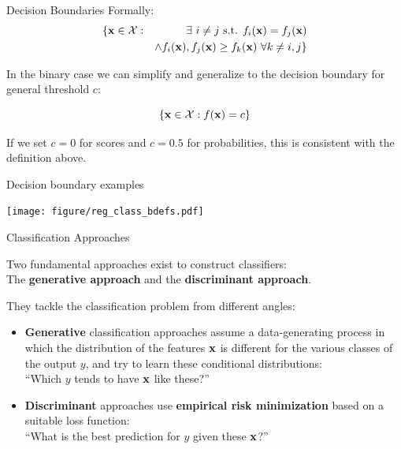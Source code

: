 \documentclass[11pt,compress,t,notes=noshow, xcolor=table]{beamer}
\begin{document}
\begin{vbframe}{Decision Boundaries}
Formally:
\begin{eqnarray*}
\{ \xv \in \Xspace: && \exists~i \ne j \text{ s.t. } \fkx[i] = \fkx[j] \\ && \land \fkx[i], \fkx[j] \ge \fkx[k] ~ \forall k \ne i, j\}
\end{eqnarray*}  
  
In the binary case we can simplify and generalize to the decision boundary for general threshold $c$:

$$
    \{ \xv \in \Xspace : \fx = c \}
$$

If we set $c=0$ for scores and $c=0.5$ for probabilities, this is consistent with the definition above.

\end{vbframe}


\begin{vbframe}{Decision boundary examples}

\begin{knitrout}\scriptsize
{}\color{fgcolor}

{\centering \texttt{[image: figure/reg\_class\_bdefs.pdf]} 

}



\end{knitrout}

\end{vbframe}

\begin{vbframe}{Classification Approaches}

  Two fundamental approaches exist to construct classifiers:\\
  The \textbf{generative approach} and the \textbf{discriminant approach}.

\lz
They tackle the classification problem from different angles:

\begin{itemize}
\item \textbf{Generative} classification approaches assume a data-generating process in which the distribution of the features $\xv$ is different for the various classes of the output $y$, and try to learn these conditional distributions:\\ \enquote{Which $y$ tends to have $\xv$ like these?}
\lz
\item \textbf{Discriminant} approaches use \textbf{empirical risk minimization} based on a suitable loss function:\\ \enquote{What is the best prediction for $y$ given these $\xv$?}
\end{itemize}
\end{vbframe}
\end{document}

